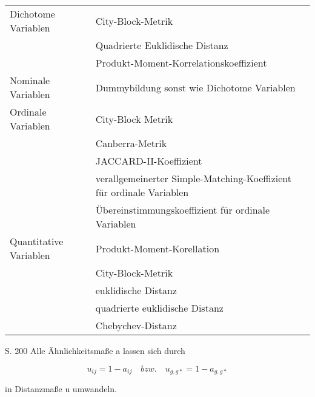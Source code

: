 \begin{tabular}{|l|l|}
	 \hline
	 Dichotome Variablen & City-Block-Metrik \\
	 & Quadrierte Euklidische Distanz \\
	 & Produkt-Moment-Korrelationskoeffizient \\ \hline
	 Nominale Variablen & Dummybildung sonst wie Dichotome Variablen \\ \hline
	 Ordinale Variablen & City-Block Metrik \\ 
	 & Canberra-Metrik \\
	 & JACCARD-II-Koeffizient \\
	 & verallgemeinerter Simple-Matching-Koeffizient für ordinale Variablen \\
	 & Übereinstimmungskoeffizient für ordinale Variablen \\ \hline
	 Quantitative Variablen & Produkt-Moment-Korellation \\
	 & City-Block-Metrik \\
	 & euklidische Distanz \\
	 & quadrierte euklidische Distanz \\
	 & Chebychev-Distanz \\ \hline
\end{tabular}


\cite{Bacher.2010} S. 200 Alle Ähnlichkeitsmaße a lassen sich durch 

\begin{equation}
u_{ij} = 1 - a_{ij} \quad bzw.\quad u_{g,g*} = 1- a_{g,g*}
\end{equation}

in Distanzmaße u umwandeln.